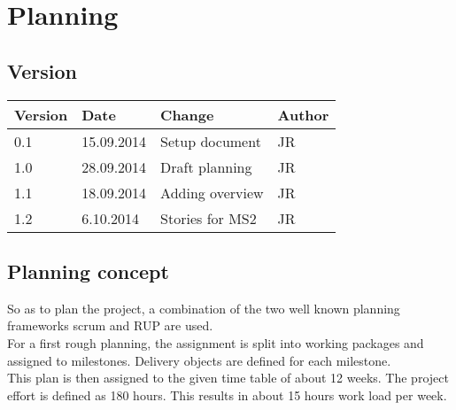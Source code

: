 


\chapter{Planning} %

\label{Planning} %



\section{Version}


\begin{tabular}{| p{1.5cm} | p{2cm} | p{9cm} | p{1.5cm} |}
    \hline
    Version & Date      & Change & Author \\ \hline
    0.1     & 15.09.2014        & Setup document                                        & JR \\ \hline
    1.0     & 28.09.2014        & Draft planning                                        & JR \\ \hline
    1.1     & 18.09.2014        & Adding overview                                       & JR \\ \hline
    1.2     & 6.10.2014        & Stories for MS2                                       & JR \\ \hline

\end{tabular}

\section{Planning concept}

So as to plan the project, a combination of the two well known planning frameworks scrum and RUP are used.\\
For a first rough planning, the assignment is split into working packages and assigned to milestones. Delivery objects are defined for each milestone.\\
This plan is then assigned to the given time table of about 12 weeks. The project effort is defined as 180 hours. This results in about 15 hours work load per week.

